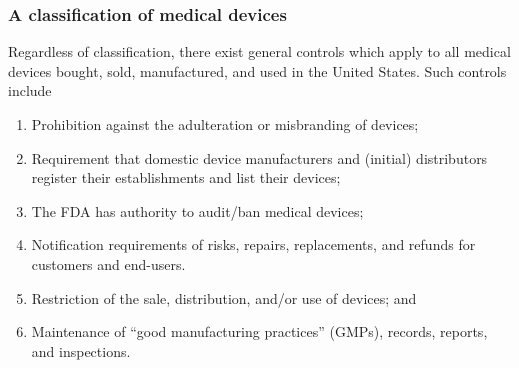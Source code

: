 \documentclass[11pt]{book}
\begin{document}
\subsubsection{A classification of medical devices}
Regardless of classification, there exist general controls which apply to all medical devices bought, sold, manufactured, and used in the United States. Such controls include
\begin{enumerate}
	\item Prohibition against the adulteration or misbranding of devices;
	\item Requirement that domestic device manufacturers and (initial) distributors register their establishments and list their devices;
	\item The FDA has authority to audit/ban medical devices;
	\item Notification requirements of risks, repairs, replacements, and refunds for customers and end-users.
	\item Restriction of the sale, distribution, and/or use of devices; and
	\item Maintenance of ``good manufacturing practices'' (GMPs), records, reports, and inspections.
\end{enumerate}
\end{document}
